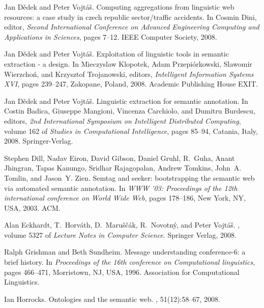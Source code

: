 \begin{thebibliography}{10}
Jan D{\v{e}}dek and Peter Vojt{\'{a}}{\v{s}}.
\newblock Computing aggregations from linguistic web resources: a case study in
  czech republic sector/traffic accidents.
\newblock In Cosmin Dini, editor, {\em Second International Conference on
  Advanced Engineering Computing and Applications in Sciences}, pages 7--12.
  {IEEE} Computer Society, 2008.

Jan D{\v{e}}dek and Peter Vojt{\'{a}}{\v{s}}.
\newblock Exploitation of linguistic tools in semantic extraction - a design.
\newblock In Mieczyslaw Klopotek, Adam Przepi{\'{o}}rkowski, Slawomir
  Wierzcho{\'{n}}, and Krzysztof Trojanowski, editors, {\em Intelligent
  Information Systems {XVI}}, pages 239--247, Zakopane, Poland, 2008. Academic
  Publishing House {EXIT}.

Jan D{\v{e}}dek and Peter Vojt{\'{a}}{\v{s}}.
\newblock Linguistic extraction for semantic annotation.
\newblock In Costin Badica, Giuseppe Mangioni, Vincenza Carchiolo, and Dumitru
  Burdescu, editors, {\em 2nd International Symposium on Intelligent
  Distributed Computing}, volume 162 of {\em Studies in Computational
  Intelligence}, pages 85--94, Catania, Italy, 2008. Springer-Verlag.

Stephen Dill, Nadav Eiron, David Gibson, Daniel Gruhl, R.~Guha, Anant Jhingran,
  Tapas Kanungo, Sridhar Rajagopalan, Andrew Tomkins, John~A. Tomlin, and
  Jason~Y. Zien.
\newblock Semtag and seeker: bootstrapping the semantic web via automated
  semantic annotation.
\newblock In {\em WWW '03: Proceedings of the 12th international conference on
  World Wide Web}, pages 178--186, New York, NY, USA, 2003. ACM.

Alan Eckhardt, T.~Horv{\'{a}}th, D.~Maru{\v{s}}{\v{c}}{\'{a}}k,
  R.~Novotn{\'{y}}, and Peter Vojt{\'{a}}{\v{s}}.
, volume 5327 of {\em Lecture Notes in Computer
  Science}.
\newblock Springer Verlag, 2008.

Ralph Grishman and Beth Sundheim.
\newblock Message understanding conference-6: a brief history.
\newblock In {\em Proceedings of the 16th conference on Computational
  linguistics}, pages 466--471, Morristown, NJ, USA, 1996. Association for
  Computational Linguistics.

Ian Horrocks.
\newblock Ontologies and the semantic web.
, 51(12):58--67, 2008.


\end{thebibliography}
